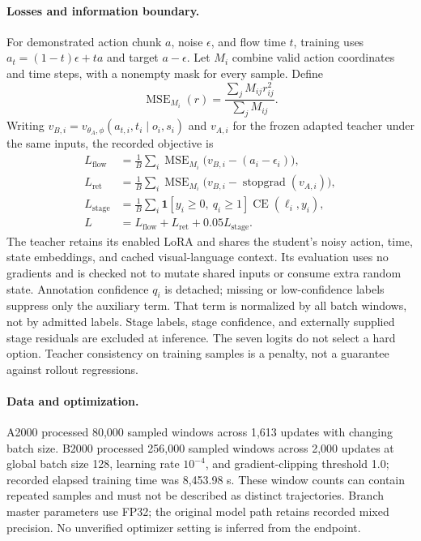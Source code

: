 \paragraph{Losses and information boundary.}
For demonstrated action chunk $a$, noise $\epsilon$, and flow time $t$, training uses $a_t=(1-t)\epsilon+ta$ and target $a-\epsilon$. Let $M_i$ combine valid action coordinates and time steps, with a nonempty mask for every sample. Define
\begin{equation}
\operatorname{MSE}_{M_i}(r)=\frac{\sum_jM_{ij}r_{ij}^2}{\sum_jM_{ij}}.
\end{equation}
Writing $v_{B,i}=v_{\theta_A,\phi}(a_{t,i},t_i\mid o_i,s_i)$ and $v_{A,i}$ for the frozen adapted teacher under the same inputs, the recorded objective is
\begin{align}
L_{\mathrm{flow}}&=\frac 1 B\sum_i\operatorname{MSE}_{M_i}\bigl(v_{B,i}-(a_i-\epsilon_i)\bigr),\\
L_{\mathrm{ret}}&=\frac 1 B\sum_i\operatorname{MSE}_{M_i}\bigl(v_{B,i}-\operatorname{stopgrad}(v_{A,i})\bigr),\\
L_{\mathrm{stage}}&=\frac 1 B\sum_i\mathbf 1[y_i\geq 0,\ q_i\geq 1]\operatorname{CE}(\ell_i,y_i),\\
L&=L_{\mathrm{flow}}+L_{\mathrm{ret}}+0.05 L_{\mathrm{stage}}.
\end{align}
The teacher retains its enabled LoRA and shares the student's noisy action, time, state embeddings, and cached visual-language context. Its evaluation uses no gradients and is checked not to mutate shared inputs or consume extra random state. Annotation confidence $q_i$ is detached; missing or low-confidence labels suppress only the auxiliary term. That term is normalized by all batch windows, not by admitted labels. Stage labels, stage confidence, and externally supplied stage residuals are excluded at inference. The seven logits do not select a hard option. Teacher consistency on training samples is a penalty, not a guarantee against rollout regressions.

\paragraph{Data and optimization.}
A2000 processed 80,000 sampled windows across 1,613 updates with changing batch size. B2000 processed 256,000 sampled windows across 2,000 updates at global batch size 128, learning rate $10^{-4}$, and gradient-clipping threshold 1.0; recorded elapsed training time was 8,453.98 s. These window counts can contain repeated samples and must not be described as distinct trajectories. Branch master parameters use FP32; the original model path retains recorded mixed precision. No unverified optimizer setting is inferred from the endpoint.


